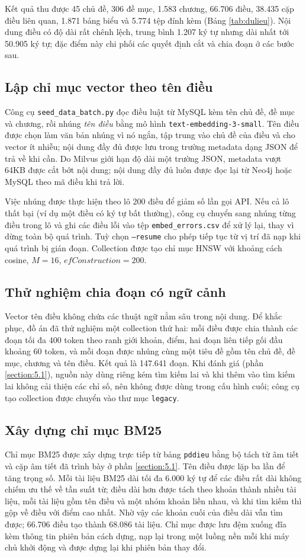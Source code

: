 \documentclass[../DoAn.tex]{subfiles}
\begin{document}
Kết quả thu được 45 chủ đề, 306 đề mục, 1.583 chương, 66.706 điều, 38.435 cặp điều liên quan, 1.871 bảng biểu và 5.774 tệp đính kèm (Bảng \ref{tab:dulieu}). Nội dung điều có độ dài rất chênh lệch, trung bình 1.207 ký tự nhưng dài nhất tới 50.905 ký tự; đặc điểm này chi phối các quyết định cắt và chia đoạn ở các bước sau.

\subsection{Lập chỉ mục vector theo tên điều}
Công cụ \texttt{seed\_data\_batch.py} đọc điều luật từ MySQL kèm tên chủ đề, đề mục và chương, rồi nhúng \emph{tên điều} bằng mô hình \texttt{text-embedding-3-small}. Tên điều được chọn làm văn bản nhúng vì nó ngắn, tập trung vào chủ đề của điều và cho vector ít nhiễu; nội dung đầy đủ được lưu trong trường metadata dạng JSON để trả về khi cần. Do Milvus giới hạn độ dài một trường JSON, metadata vượt 64KB được cắt bớt nội dung; nội dung đầy đủ luôn được đọc lại từ Neo4j hoặc MySQL theo mã điều khi trả lời.

Việc nhúng được thực hiện theo lô 200 điều để giảm số lần gọi API. Nếu cả lô thất bại (ví dụ một điều có ký tự bất thường), công cụ chuyển sang nhúng từng điều trong lô và ghi các điều lỗi vào tệp \texttt{embed\_errors.csv} để xử lý lại, thay vì dừng toàn bộ quá trình. Tuỳ chọn \texttt{--resume} cho phép tiếp tục từ vị trí đã nạp khi quá trình bị gián đoạn. Collection được tạo chỉ mục HNSW với khoảng cách cosine, $M = 16$, $efConstruction = 200$.

\subsection{Thử nghiệm chia đoạn có ngữ cảnh}
Vector tên điều không chứa các thuật ngữ nằm sâu trong nội dung. Để khắc phục, đồ án đã thử nghiệm một collection thứ hai: mỗi điều được chia thành các đoạn tối đa 400 token theo ranh giới khoản, điểm, hai đoạn liên tiếp gối đầu khoảng 60 token, và mỗi đoạn được nhúng cùng một tiêu đề gồm tên chủ đề, đề mục, chương và tên điều. Kết quả là 147.641 đoạn. Khi đánh giá (phần \ref{section:5.1}), nguồn này dùng riêng kém tìm kiếm lai và khi thêm vào tìm kiếm lai không cải thiện các chỉ số, nên không được dùng trong cấu hình cuối; công cụ tạo collection được chuyển vào thư mục \texttt{legacy}.

\subsection{Xây dựng chỉ mục BM25}
Chỉ mục BM25 được xây dựng trực tiếp từ bảng \texttt{pddieu} bằng bộ tách từ âm tiết và cặp âm tiết đã trình bày ở phần \ref{section:5.1}. Tên điều được lặp ba lần để tăng trọng số. Mỗi tài liệu BM25 dài tối đa 6.000 ký tự để các điều rất dài không chiếm ưu thế về tần suất từ; điều dài hơn được tách theo khoản thành nhiều tài liệu, mỗi tài liệu gồm tên điều và một nhóm khoản liền nhau, và khi tìm kiếm thì gộp về điều với điểm cao nhất. Nhờ vậy các khoản cuối của điều dài vẫn tìm được; 66.706 điều tạo thành 68.086 tài liệu. Chỉ mục được lưu đệm xuống đĩa kèm thông tin phiên bản cách dựng, nạp lại trong một luồng nền mỗi khi máy chủ khởi động và được dựng lại khi phiên bản thay đổi.
\end{document}
